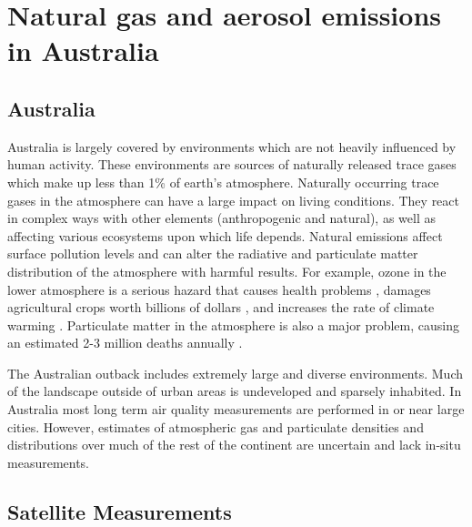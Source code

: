 \section{Natural gas and aerosol emissions in Australia}
\label{ch1:sec:emissions}

  \subsection{Australia}

    Australia is largely covered by environments which are not heavily influenced by human activity.
    These environments are sources of naturally released trace gases which make up less than 1\% of earth's atmosphere.
    Naturally occurring trace gases in the atmosphere can have a large impact on living conditions.
    They react in complex ways with other elements (anthropogenic and natural), as well as affecting various ecosystems upon which life depends.
    Natural emissions affect surface pollution levels and can alter the radiative and particulate matter distribution of the atmosphere with harmful results.
    For example, ozone in the lower atmosphere is a serious hazard that causes health problems \citep{Hsieh_2013}, damages agricultural crops worth billions of dollars \citep{Avnery2011}, and increases the rate of climate warming \citep{IPCC_2013_chap8}.
    Particulate matter in the atmosphere is also a major problem, causing an estimated 2-3 million deaths annually \citep{Hoek_2013, Krewski_2009, Silva_2013, Lelieveld_2015}.

    The Australian outback includes extremely large and diverse environments.
    Much of the landscape outside of urban areas is undeveloped and sparsely inhabited.
    In Australia most long term air quality measurements are performed in or near large cities.
    However, estimates of atmospheric gas and particulate densities and distributions over much of the rest of the continent are uncertain and lack in-situ measurements.

  \subsection{Satellite Measurements}

